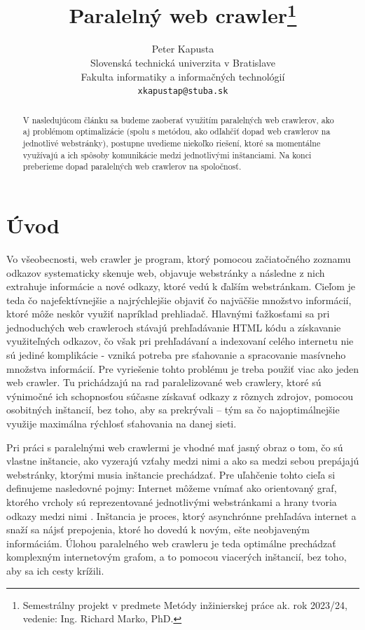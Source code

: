 \documentclass[10pt,twoside,slovak,a4paper]{article}
\title{Paralelný web crawler\thanks{Semestrálny projekt v predmete Metódy inžinierskej práce ak. rok 2023/24, vedenie: Ing. Richard Marko, PhD.}}
\author{Peter Kapusta \\
    \small Slovenská technická univerzita v Bratislave \\
    \small Fakulta informatiky a informačných technológií \\
    \small \texttt{xkapustap@stuba.sk}
}
\begin{document}
\maketitle

\begin{abstract}
    V nasledujúcom článku sa budeme zaoberať využitím paralelných web crawlerov, ako aj problémom optimalizácie (spolu s metódou, ako odľahčiť dopad web crawlerov na jednotlivé webstránky), postupne uvedieme niekoľko riešení, ktoré sa momentálne využívajú a ich spôsoby komunikácie medzi jednotlivými inštanciami. Na konci preberieme dopad paralelných web crawlerov na spoločnosť.
\end{abstract}

\section{Úvod}

Vo všeobecnosti, web crawler je program, ktorý pomocou začiatočného zoznamu odkazov systematicky skenuje web, objavuje webstránky a následne z nich extrahuje informácie a nové odkazy, ktoré vedú k ďalším webstránkam. Cieľom je teda čo najefektívnejšie a najrýchlejšie objaviť čo najväčšie množstvo informácií, ktoré môže neskôr využiť napríklad prehliadač. Hlavnými ťažkosťami sa pri jednoduchých web crawleroch stávajú prehľadávanie HTML kódu a získavanie využiteľných odkazov, čo však pri prehľadávaní a indexovaní celého internetu nie sú jediné komplikácie - vzniká potreba pre sťahovanie a spracovanie masívneho množstva informácií. Pre vyriešenie tohto problému je treba použiť viac ako jeden web crawler. Tu prichádzajú na rad paralelizované web crawlery, ktoré sú výnimočné ich schopnosťou súčasne získavať odkazy z rôznych zdrojov, pomocou osobitných inštancií, bez toho, aby sa prekrývali – tým sa čo najoptimálnejšie využije maximálna rýchlosť sťahovania na danej sieti.

Pri práci s paralelnými web crawlermi je vhodné mať jasný obraz o tom, čo sú vlastne inštancie, ako vyzerajú vzťahy medzi nimi a ako sa medzi sebou prepájajú webstránky, ktorými musia inštancie prechádzať. Pre uľahčenie tohto cieľa si definujeme nasledovné pojmy: Internet môžeme vnímať ako orientovaný graf, ktorého vrcholy sú reprezentované jednotlivými webstránkami a hrany tvoria odkazy medzi nimi \cite{7148493}. Inštancia je proces, ktorý asynchrónne prehľadáva internet a snaží sa nájsť prepojenia, ktoré ho dovedú k novým, ešte neobjaveným informáciám. Úlohou paralelného web crawleru je teda optimálne prechádzať komplexným internetovým grafom, a to pomocou viacerých inštancií, bez toho, aby sa ich cesty krížili.
\end{document}
